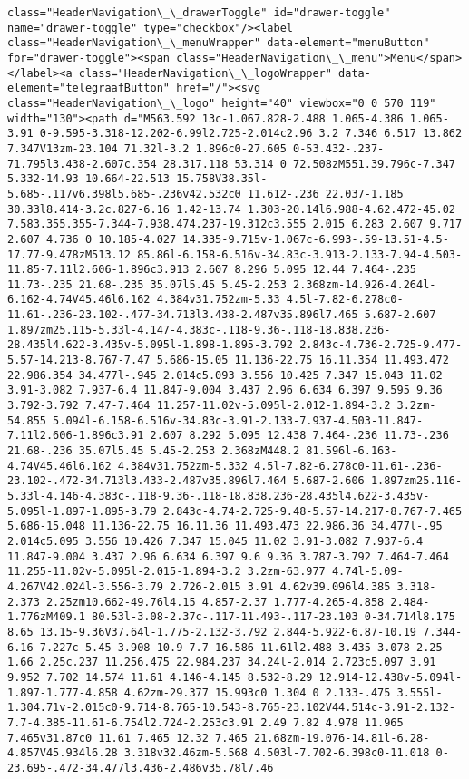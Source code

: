 \documentclass[11pt]{article}
\begin{document}
\begin{Verbatim}[commandchars=\\\{\}]
class="HeaderNavigation\_\_drawerToggle" id="drawer-toggle" name="drawer-toggle" type="checkbox"/><label class="HeaderNavigation\_\_menuWrapper" data-element="menuButton" for="drawer-toggle"><span class="HeaderNavigation\_\_menu">Menu</span></label><a class="HeaderNavigation\_\_logoWrapper" data-element="telegraafButton" href="/"><svg class="HeaderNavigation\_\_logo" height="40" viewbox="0 0 570 119" width="130"><path d="M563.592 13c-1.067.828-2.488 1.065-4.386 1.065-3.91 0-9.595-3.318-12.202-6.99l2.725-2.014c2.96 3.2 7.346 6.517 13.862 7.347V13zm-23.104 71.32l-3.2 1.896c0-27.605 0-53.432-.237-71.795l3.438-2.607c.354 28.317.118 53.314 0 72.508zM551.39.796c-7.347 5.332-14.93 10.664-22.513 15.758V38.35l-5.685-.117v6.398l5.685-.236v42.532c0 11.612-.236 22.037-1.185 30.33l8.414-3.2c.827-6.16 1.42-13.74 1.303-20.14l6.988-4.62.472-45.02 7.583.355.355-7.344-7.938.474.237-19.312c3.555 2.015 6.283 2.607 9.717 2.607 4.736 0 10.185-4.027 14.335-9.715v-1.067c-6.993-.59-13.51-4.5-17.77-9.478zM513.12 85.86l-6.158-6.516v-34.83c-3.913-2.133-7.94-4.503-11.85-7.11l2.606-1.896c3.913 2.607 8.296 5.095 12.44 7.464-.235 11.73-.235 21.68-.235 35.07l5.45 5.45-2.253 2.368zm-14.926-4.264l-6.162-4.74V45.46l6.162 4.384v31.752zm-5.33 4.5l-7.82-6.278c0-11.61-.236-23.102-.477-34.713l3.438-2.487v35.896l7.465 5.687-2.607 1.897zm25.115-5.33l-4.147-4.383c-.118-9.36-.118-18.838.236-28.435l4.622-3.435v-5.095l-1.898-1.895-3.792 2.843c-4.736-2.725-9.477-5.57-14.213-8.767-7.47 5.686-15.05 11.136-22.75 16.11.354 11.493.472 22.986.354 34.477l-.945 2.014c5.093 3.556 10.425 7.347 15.043 11.02 3.91-3.082 7.937-6.4 11.847-9.004 3.437 2.96 6.634 6.397 9.595 9.36 3.792-3.792 7.47-7.464 11.257-11.02v-5.095l-2.012-1.894-3.2 3.2zm-54.855 5.094l-6.158-6.516v-34.83c-3.91-2.133-7.937-4.503-11.847-7.11l2.606-1.896c3.91 2.607 8.292 5.095 12.438 7.464-.236 11.73-.236 21.68-.236 35.07l5.45 5.45-2.253 2.368zM448.2 81.596l-6.163-4.74V45.46l6.162 4.384v31.752zm-5.332 4.5l-7.82-6.278c0-11.61-.236-23.102-.472-34.713l3.433-2.487v35.896l7.464 5.687-2.606 1.897zm25.116-5.33l-4.146-4.383c-.118-9.36-.118-18.838.236-28.435l4.622-3.435v-5.095l-1.897-1.895-3.79 2.843c-4.74-2.725-9.48-5.57-14.217-8.767-7.465 5.686-15.048 11.136-22.75 16.11.36 11.493.473 22.986.36 34.477l-.95 2.014c5.095 3.556 10.426 7.347 15.045 11.02 3.91-3.082 7.937-6.4 11.847-9.004 3.437 2.96 6.634 6.397 9.6 9.36 3.787-3.792 7.464-7.464 11.255-11.02v-5.095l-2.015-1.894-3.2 3.2zm-63.977 4.74l-5.09-4.267V42.024l-3.556-3.79 2.726-2.015 3.91 4.62v39.096l4.385 3.318-2.373 2.25zm10.662-49.76l4.15 4.857-2.37 1.777-4.265-4.858 2.484-1.776zM409.1 80.53l-3.08-2.37c-.117-11.493-.117-23.103 0-34.714l8.175 8.65 13.15-9.36V37.64l-1.775-2.132-3.792 2.844-5.922-6.87-10.19 7.344-6.16-7.227c-5.45 3.908-10.9 7.7-16.586 11.61l2.488 3.435 3.078-2.25 1.66 2.25c.237 11.256.475 22.984.237 34.24l-2.014 2.723c5.097 3.91 9.952 7.702 14.574 11.61 4.146-4.145 8.532-8.29 12.914-12.438v-5.094l-1.897-1.777-4.858 4.62zm-29.377 15.993c0 1.304 0 2.133-.475 3.555l-1.304.71v-2.015c0-9.714-8.765-10.543-8.765-23.102V44.514c-3.91-2.132-7.7-4.385-11.61-6.754l2.724-2.253c3.91 2.49 7.82 4.978 11.965 7.465v31.87c0 11.61 7.465 12.32 7.465 21.68zm-19.076-14.81l-6.28-4.857V45.934l6.28 3.318v32.46zm-5.568 4.503l-7.702-6.398c0-11.018 0-23.695-.472-34.477l3.436-2.486v35.78l7.46 
\end{Verbatim}
\end{document}
